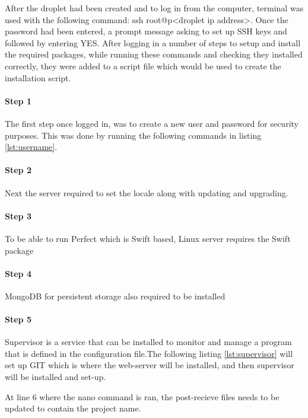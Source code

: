 After the droplet had been created and to log in from the computer, terminal was used with the following command: ssh root@p<droplet ip address>. Once the password had been entered, a prompt message asking to set up SSH keys and followed by entering YES. After logging in a number of steps to setup and install the required packages, while running these commands and checking they installed correctly, they were added to a script file which would be used to create the installation script.

\paragraph{Step 1}
The first step once logged in, was to create a new user and password for security purposes. This was done by running the following commands in listing \ref{lst:username}.



\paragraph{Step 2}
Next the server required to set the locale along with updating and upgrading.


\paragraph{Step 3}
To be able to run Perfect which is Swift based, Linux server requires the Swift package


\paragraph{Step 4}
MongoDB for persistent storage also required to be installed


\paragraph{Step 5}
Supervisor is a service that can be installed to monitor and manage a program that is defined in the configuration file.The following listing \ref{lst:supervisor} will set up GIT which is where the web-server will be installed, and then supervisor will be installed and set-up.

At line 6 where the nano command is ran, the post-recieve files needs to be updated to contain the project name.

